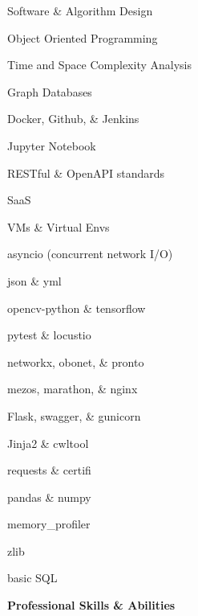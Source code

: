 \documentclass[letterpaper,final]{memoir}
\newcommand{\Sep}{\vspace{1.0em}}
\newcommand{\SmallSep}{\vspace{0.4em}}
\newcommand{\CVItem}[1]
	{\textbf{\color{Blue} #1}}
\begin{document}
\begin{multicols}{2}

    \begin{compactitem}[\color{Blue}$\circ$]
        
        \item Software \& Algorithm Design
        \SmallSep
        \item Object Oriented Programming
        \SmallSep
        \item Time and Space Complexity Analysis
        \SmallSep
        \item Graph Databases
		\SmallSep
        \item Docker, Github, \& Jenkins
        \SmallSep
        \item Jupyter Notebook
        \SmallSep
        \item RESTful \& OpenAPI standards
        \SmallSep
        \item SaaS
		\SmallSep
        \item VMs \& Virtual Envs
        \SmallSep
        \item asyncio (concurrent network I/O)
        \SmallSep
        \item json \& yml
        \SmallSep
        \item opencv-python \& tensorflow
        \SmallSep
        \item pytest \& locustio
        \SmallSep
        \item networkx, obonet, \& pronto
        \SmallSep 
        \item mezos, marathon, \& nginx
        \SmallSep
        \item Flask, swagger, \& gunicorn
        \SmallSep
        \item Jinja2 \& cwltool
        \SmallSep
        \item requests \& certifi
        \SmallSep
        \item pandas \& numpy
        \SmallSep
        \item memory\_profiler
        \SmallSep
        \item zlib
        \SmallSep
        \item basic SQL
      
    \end{compactitem}

\end{multicols}
\Sep

\CVItem{Professional Skills \& Abilities}
\Sep
\end{document}
